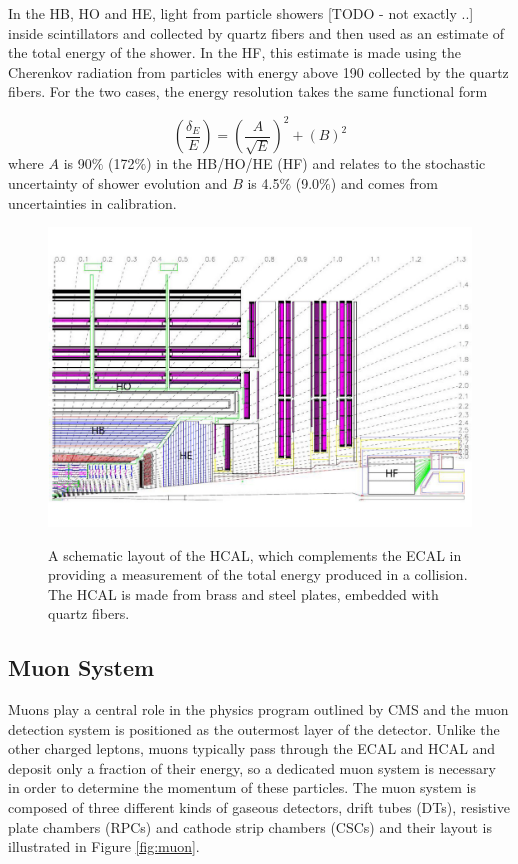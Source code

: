 In the HB, HO and HE, light from particle showers
 [TODO - not exactly ..] 
 inside scintillators and collected by quartz fibers
 and then used as an estimate of the total energy of the shower.
In the HF, this estimate is made using the Cherenkov 
 radiation from particles with energy above 190 \keV
 collected by the quartz fibers.
For the two cases, the energy resolution takes the same
 functional form 

\begin{equation}\label{eq:hcal_res}
 \left(\frac{\delta_E}{E}\right) =  \left(\frac{A}{\sqrt{E}}\right)^2 + (B)^2 
\end{equation}
 where $A$ is 90$\%$ (172$\%$) in the HB/HO/HE (HF)
  and relates to the stochastic uncertainty of shower evolution
 and $B$ is 4.5$\%$ (9.0$\%$) and comes from uncertainties in calibration.


\begin{figure}[tb]
\caption[The CMS Hadronic Calorimeter]{
 A schematic layout of the HCAL, which complements the ECAL
  in providing a measurement of the total energy produced 
  in a collision.
 The HCAL is made from brass and steel plates,
  embedded with quartz fibers.
 }
\includegraphics[width=\textwidth]{pdfs/experiment/cms_hcal.pdf}
\label{fig:hcal}
\end{figure}
 

 \subsection{Muon System}

Muons play a central role in the physics program outlined
 by CMS and the muon detection system is positioned 
 as the outermost layer of the detector. 
Unlike the other charged leptons, 
 muons typically pass through the ECAL and HCAL and
 deposit only a fraction of their energy, so
 a dedicated muon system is necessary in order to
 determine the momentum of these particles.
The muon system is composed of three different kinds
 of gaseous detectors,
 drift tubes (DTs), resistive plate chambers (RPCs)
 and cathode strip chambers (CSCs) and their layout is
 illustrated in Figure \ref{fig:muon}.

